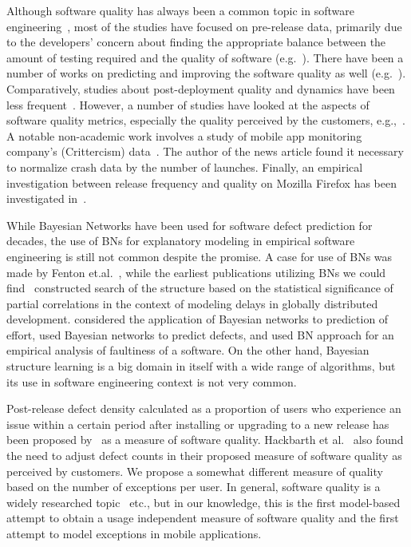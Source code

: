 \documentclass[smallextended]{svjour3}       %
\begin{document}
Although software quality has always been a common
topic in software engineering~\cite{boehm1976quantitative,kitchenham1996software}, most of
the studies have focused on pre-release data, primarily due to the
developers' concern about finding the appropriate balance between
the amount of testing required and the quality of software
(e.g.~\cite{rubin2016challenges,dalal1988should}). There have been a
number of works on predicting and improving the software quality as
well (e.g.~\cite{MHP13,zhang2015towards,KSAHMSU13,MW00}). Comparatively,
studies about post-deployment quality and dynamics have been less
frequent~\cite{li2011characterizing,kenny1993estimating}. However, a
number of studies have looked at the aspects of software quality
metrics, especially the quality perceived by the customers,
e.g.,~\cite{mockus2005predictors,IQ08,hmps15,rotella2011implementing,M14}. A notable
non-academic work involves a study of mobile app monitoring
company's (Crittercism) data~\cite{crittercism12}. The author of the
news article found it necessary to normalize crash data by the
number of launches. Finally, an empirical investigation between
release frequency and quality on Mozilla Firefox has been
investigated in~\cite{khomh2012faster}. 

While Bayesian Networks have been used for software defect prediction 
for decades, the use of BNs for explanatory modeling in
empirical software engineering is still not common despite the
promise. A case for use of BNs was made
by Fenton et.al.~\cite{fenton1999critique,fenton2002software}, while the earliest publications
utilizing BNs we could find~\cite{HM03a} constructed search of the
structure based on the statistical significance of partial
correlations in the context of modeling delays in globally
distributed development. \cite{stamelos2003use,pendharkar2005probabilistic} considered
the application of Bayesian networks to prediction of effort, 
\cite{fenton2007predicting,neil1996predicting,okutan2014software} 
used Bayesian networks to predict defects, and \cite{pai2007empirical} 
used BN approach for an empirical analysis of faultiness of a software. 
On the other hand, Bayesian structure learning is a big domain in itself 
with a wide range of algorithms, but its use in software engineering context 
is not very common.

Post-release defect density calculated as a proportion of users who experience an issue within a certain period after installing or upgrading to a new release has been proposed by~\cite{mockus2008interval,mockus2005predictors} as a measure of software quality.  Hackbarth et al.~\cite{hackbarth2016improving} also found the need to adjust defect counts in their proposed measure of software quality as perceived by customers. We propose a somewhat different measure of quality based on the number of exceptions per user. In general, software quality is a widely researched topic~\cite{kan2002metrics,kitchenham1996software,schulmeyer1992handbook} etc., but in our knowledge, this is the first model-based attempt to obtain a usage independent measure of software quality and the first attempt to model exceptions in mobile applications.
\end{document}
